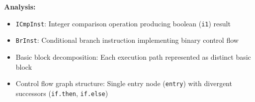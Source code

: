 \textbf{Analysis:}
\begin{itemize}[noitemsep]
  \item \texttt{ICmpInst}: Integer comparison operation producing boolean (\texttt{i1}) result
  \item \texttt{BrInst}: Conditional branch instruction implementing binary control flow
  \item Basic block decomposition: Each execution path represented as distinct basic block
  \item Control flow graph structure: Single entry node (\texttt{entry}) with divergent successors (\texttt{if.then}, \texttt{if.else})
\end{itemize}

